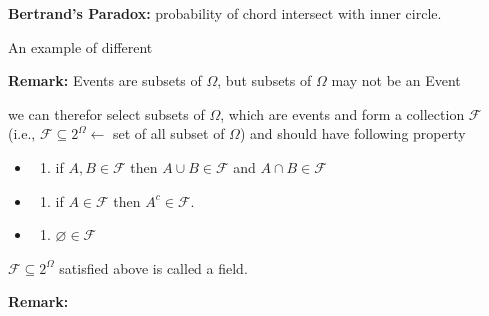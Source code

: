 \documentclass[
  letterpaper,
  DIV=11,
  numbers=noendperiod]{scrreprt}
\providecommand{\tightlist}{%
  \setlength{\itemsep}{0pt}\setlength{\parskip}{0pt}}
\theoremstyle{definition}
\theoremstyle{plain}
\theoremstyle{plain}
\theoremstyle{definition}
\theoremstyle{plain}
\theoremstyle{plain}
\theoremstyle{remark}
\begin{document}
\begin{tcolorbox}[enhanced jigsaw, leftrule=.75mm, bottomrule=.15mm, left=2mm, colback=white, colframe=quarto-callout-note-color-frame, toprule=.15mm, breakable, arc=.35mm, rightrule=.15mm, opacityback=0]
\begin{minipage}[t]{5.5mm}
\textcolor{quarto-callout-note-color}{\faInfo}
\end{minipage}%
\begin{minipage}[t]{\textwidth - 5.5mm}

\textbf{Bertrand's Paradox:} probability of chord intersect with inner
circle.

An example of different

\end{minipage}%
\end{tcolorbox}

\textbf{Remark:} Events are subsets of \(\Omega\), but subsets of
\(\Omega\) may not be an Event

we can therefor select subsets of \(\Omega\), which are events and form
a collection \(\mathcal{F}\) (i.e.,
\(\mathcal{F} \subseteq 2^\Omega \leftarrow\) set of all subset of
\(\Omega\)) and should have following property

\begin{itemize}
\tightlist
\item
  \begin{enumerate}
  \def\labelenumi{(\alph{enumi})}
  \tightlist
  \item
    if \(A, B \in \mathcal{F}\) then \(A \cup B \in \mathcal{F}\) and
    \(A \cap B \in \mathcal{F}\)
  \end{enumerate}
\item
  \begin{enumerate}
  \def\labelenumi{(\alph{enumi})}
  \setcounter{enumi}{1}
  \tightlist
  \item
    if \(A \in \mathcal{F}\) then \(A^c \in \mathcal{F}\).
  \end{enumerate}
\item
  \begin{enumerate}
  \def\labelenumi{(\alph{enumi})}
  \setcounter{enumi}{2}
  \tightlist
  \item
    \(\varnothing \in \mathcal{F}\)
  \end{enumerate}
\end{itemize}

\(\mathcal{F} \subseteq 2^\Omega\) satisfied above is called a field.

\textbf{Remark:}
\end{document}
